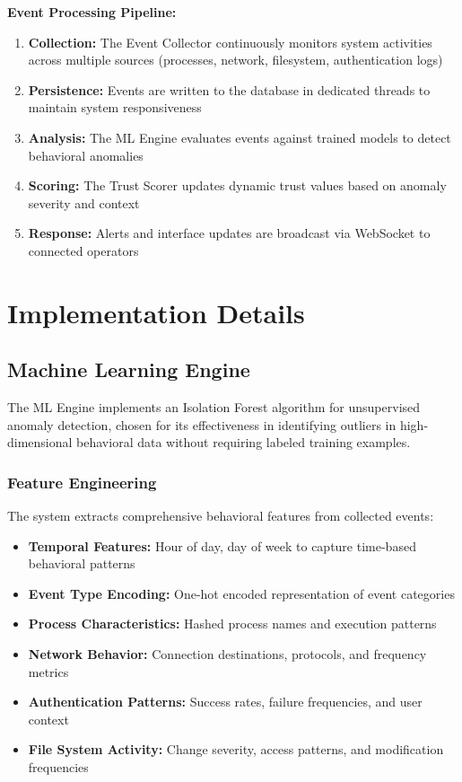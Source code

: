 \documentclass[conference]{IEEEtran}
\begin{document}
\textbf{Event Processing Pipeline:}
\begin{enumerate}
    \item \textbf{Collection:} The Event Collector continuously monitors system activities across multiple sources (processes, network, filesystem, authentication logs)
    \item \textbf{Persistence:} Events are written to the database in dedicated threads to maintain system responsiveness
    \item \textbf{Analysis:} The ML Engine evaluates events against trained models to detect behavioral anomalies
    \item \textbf{Scoring:} The Trust Scorer updates dynamic trust values based on anomaly severity and context
    \item \textbf{Response:} Alerts and interface updates are broadcast via WebSocket to connected operators
\end{enumerate}

\section{Implementation Details}

\subsection{Machine Learning Engine}
The ML Engine implements an Isolation Forest algorithm for
unsupervised anomaly detection, chosen for its effectiveness in
identifying outliers in high-dimensional behavioral data without
requiring labeled training examples.

\subsubsection{Feature Engineering}
The system extracts comprehensive
behavioral features from collected events:
\begin{itemize}[leftmargin=*]
  \item \textbf{Temporal Features:} Hour of day, day of week to capture
time-based behavioral patterns
  \item \textbf{Event Type Encoding:} One-hot encoded representation of
event categories
  \item \textbf{Process Characteristics:} Hashed process names and execution patterns
  \item \textbf{Network Behavior:} Connection destinations, protocols, and
frequency metrics  
  \item \textbf{Authentication Patterns:} Success rates, failure frequencies,
and user context
  \item \textbf{File System Activity:} Change severity, access patterns, and
modification frequencies
\end{itemize}
\end{document}
